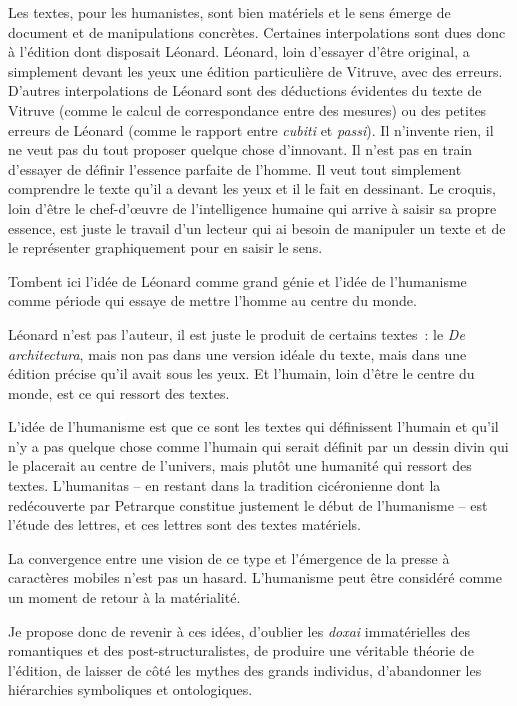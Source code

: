 Les textes, pour les humanistes, sont bien matériels et le sens émerge
de document et de manipulations concrètes. Certaines interpolations sont
dues donc à l'édition dont disposait Léonard. Léonard, loin d'essayer
d'être original, a simplement devant les yeux une édition particulière
de Vitruve, avec des erreurs. D'autres interpolations de Léonard sont
des déductions évidentes du texte de Vitruve (comme le calcul de
correspondance entre des mesures) ou des petites erreurs de Léonard
(comme le rapport entre \emph{cubiti} et \emph{passi}). Il n'invente
rien, il ne veut pas du tout proposer quelque chose d'innovant. Il n'est
pas en train d'essayer de définir l'essence parfaite de l'homme. Il veut
tout simplement comprendre le texte qu'il a devant les yeux et il le
fait en dessinant. Le croquis, loin d'être le chef-d'œuvre de
l'intelligence humaine qui arrive à saisir sa propre essence, est juste
le travail d'un lecteur qui ai besoin de manipuler un texte et de le
représenter graphiquement pour en saisir le sens.

Tombent ici l'idée de Léonard comme grand génie et l'idée de l'humanisme
comme période qui essaye de mettre l'homme au centre du monde.

Léonard n'est pas l'auteur, il est juste le produit de certains textes~:
le \emph{De architectura}, mais non pas dans une version idéale du
texte, mais dans une édition précise qu'il avait sous les yeux. Et
l'humain, loin d'être le centre du monde, est ce qui ressort des textes.

L'idée de l'humanisme est que ce sont les textes qui définissent
l'humain et qu'il n'y a pas quelque chose comme l'humain qui serait
définit par un dessin divin qui le placerait au centre de l'univers,
mais plutôt une humanité qui ressort des textes. L'humanitas -- en
restant dans la tradition cicéronienne dont la redécouverte par
Petrarque constitue justement le début de l'humanisme -- est l'étude des
lettres, et ces lettres sont des textes matériels.

La convergence entre une vision de ce type et l'émergence de la presse à
caractères mobiles n'est pas un hasard. L'humanisme peut être considéré
comme un moment de retour à la matérialité.

Je propose donc de revenir à ces idées, d'oublier les \emph{doxai}
immatérielles des romantiques et des post-structuralistes, de produire
une véritable théorie de l'édition, de laisser de côté les mythes des
grands individus, d'abandonner les hiérarchies symboliques et
ontologiques.

